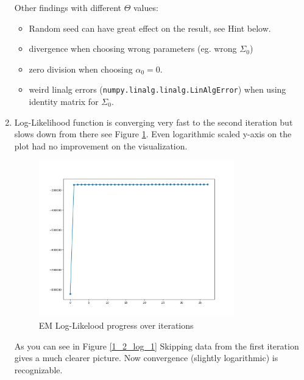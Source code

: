 \documentclass[12pt,a4paper]{article}
\begin{document}
\begin{enumerate}[start=2,label*={\arabic*.}]
  Other findings with different $\Theta$ values:
  \begin{itemize}
    \item Random seed can have great effect on the result, see Hint below.
    \item divergence when choosing wrong parameters (eg. wrong $\Sigma_0$)
    \item zero division when choosing $\alpha_0 = 0$.
    \item weird linalg errors (\texttt{numpy.linalg.linalg.LinAlgError}) when
    using identity matrix for $\Sigma_0$.
  \end{itemize}
  
  \item Log-Likelihood function is converging very fast to the second iteration
  but slows down from there see Figure \ref{1_2_log}. Even logarithmic scaled
  y-axis on the plot had no improvement on the visualization.

\begin{figure}[H]
  \centering
  \includegraphics[width=0.8\textwidth]{figures/1_2_log.png}
	\caption{EM Log-Likelood progress over iterations}
	\label{1_2_log}
\end{figure}
  
  As you can see in Figure \ref{1_2_log_1} Skipping data from the first
  iteration gives a much clearer picture. Now convergence (slightly logarithmic)
  is recognizable.
  

\end{enumerate}
\end{document}
